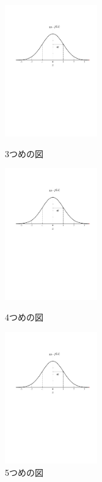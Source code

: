 \documentclass[a4paper,11pt,dvipdfmx]{jarticle}  %
\begin{document}
\begin{figure}[htbp]
 \begin{minipage}{0.33\hsize}
  \begin{center}
   \includegraphics[width=40mm]{gauss001.pdf}
  \end{center}
  \caption{3つめの図}
  \label{fig:three}
 \end{minipage}
 \begin{minipage}{0.33\hsize}
 \begin{center}
  \includegraphics[width=40mm]{gauss001.pdf}
 \end{center}
  \caption{4つめの図}
  \label{fig:four}
 \end{minipage}
 \begin{minipage}{0.33\hsize}
 \begin{center}
  \includegraphics[width=40mm]{gauss001.pdf}
 \end{center}
  \caption{5つめの図}
  \label{fig:five}
 \end{minipage}
\end{figure}
\end{document}
